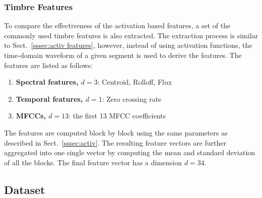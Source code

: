 \documentclass{article}
\begin{document}
{{{{{\subsubsection{Timbre Features}
\label{sssec:timbre features}
To compare the effectiveness of the activation based features, a set of the commonly used timbre features is also extracted. The extraction process is similar to Sect.~\ref{sssec:activ features}, however, instead of using activation functions, the time-domain waveform of a given segment is used to derive the features. The features are listed as follows: 

\begin{enumerate}
	\item \textbf{Spectral features, $d = 3$}: Centroid, Rolloff, Flux
	\item \textbf{Temporal features, $d = 1$}: Zero crossing rate
	\item \textbf{MFCCs, $d = 13$}: the first 13 MFCC coefficients
\end{enumerate}

The features are computed block by block using the same parameters as described in Sect.~\ref{sssec:activ}. The resulting feature vectors are further aggregated into one single vector by computing the mean and standard deviation of all the blocks. The final feature vector has a dimension $d = 34$. 

%

\subsection{Dataset}
}}}}}
\end{document}
